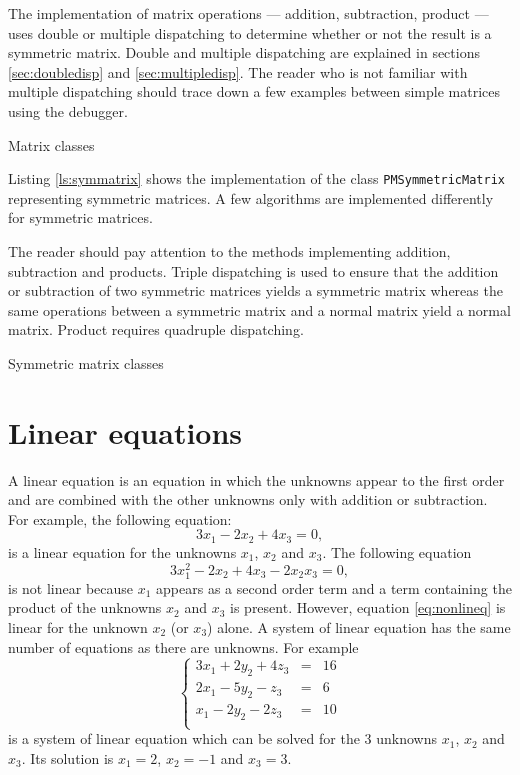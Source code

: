 \documentclass[twoside]{book}
\begin{document}
The implementation of matrix operations --- addition, subtraction,
product --- uses double or multiple dispatching to determine
whether or not the result is a symmetric matrix. Double and
multiple dispatching are explained in sections
\ref{sec:doubledisp} and \ref{sec:multipledisp}. The reader who is
not familiar with multiple dispatching should trace down a few
examples between simple matrices using the debugger.
\begin{listing} Matrix classes \label{ls:matrix}

\end{listing}
Listing \ref{ls:symmatrix} shows the implementation of the class
{\tt PMSymmetricMatrix} representing symmetric matrices. A few
algorithms are implemented differently for symmetric matrices.

The reader should pay attention to the methods implementing
addition, subtraction and products. Triple dispatching is used to
ensure that the addition or subtraction of two symmetric matrices
yields a symmetric matrix whereas the same operations between a
symmetric matrix and a normal matrix yield a normal matrix.
Product requires quadruple dispatching.
\begin{listing} Symmetric matrix classes \label{ls:symmatrix}

\end{listing}




\section{Linear equations}
\label{sec:lineqs} A linear equation is an equation in which the
unknowns appear to the first order and are combined with the other
unknowns only with addition or subtraction. For example, the
following equation:
\begin{equation}
  3x_1-2x_2+4x_3=0,
\end{equation}
is a linear equation for the unknowns $x_1$, $x_2$ and $x_3$. The
following equation
\begin{equation}
\label{eq:nonlineq}
  3x_1^2-2x_2+4x_3 - 2 x_2 x_3=0,
\end{equation}
is not linear because $x_1$ appears as a second order term and a
term containing the product of the unknowns $x_2$ and $x_3$ is
present. However, equation \ref{eq:nonlineq} is linear for the
unknown $x_2$ (or $x_3$) alone. A system of linear equation has
the same number of equations as there are unknowns. For example
\begin{equation}
\label{eq:lineqex}
  \left\{
  \begin{array}{lcr}
  3x_1+2y_2+4z_3&=&16\\
  2x_1-5y_2-z_3&=&6\\
  x_1-2y_2-2z_3&=&10\\
\end{array}\right.
\end{equation}
is a system of linear equation which can be solved for the 3
unknowns $x_1$, $x_2$ and $x_3$. Its solution is $x_1=2$, $x_2=-1$
and $x_3=3$.
\end{document}
